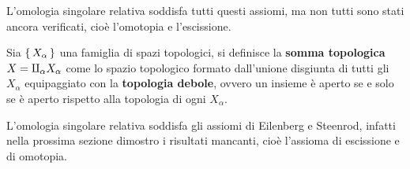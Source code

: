 L'omologia singolare relativa soddisfa tutti questi assiomi,
ma non tutti sono stati ancora verificati, cioè l'omotopia e l'escissione.

\begin{definition}
  Sia $ \set{X_\alpha} $ una famiglia di spazi topologici, si definisce la \textbf{somma topologica}
  $ X = \invamalg_\alpha X_\alpha $
  come lo spazio topologico formato dall'unione disgiunta di tutti gli $ X_\alpha $ equipaggiato
  con la \textbf{topologia debole},
  ovvero un insieme è aperto se e solo se è aperto rispetto alla topologia di ogni $ X_\alpha $.
\end{definition}


\begin{osservation}
  L'omologia singolare relativa soddisfa gli assiomi di Eilenberg e Steenrod, infatti
  nella prossima sezione dimostro i risultati mancanti, cioè l'assioma di escissione
  e di omotopia.
\end{osservation}


